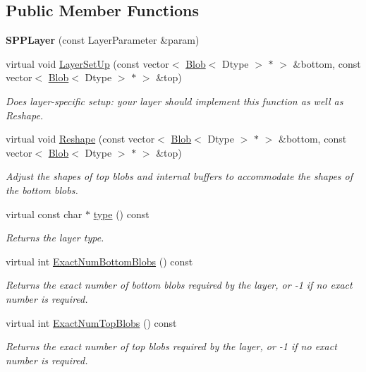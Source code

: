 \subsection*{Public Member Functions}
\begin{DoxyCompactItemize}
\item 
{\bfseries S\+P\+P\+Layer} (const Layer\+Parameter \&param)\hypertarget{classcaffe_1_1SPPLayer_a2f2bfccabcb9c04d28435ae6cb535dcf}{}\label{classcaffe_1_1SPPLayer_a2f2bfccabcb9c04d28435ae6cb535dcf}

\item 
virtual void \hyperlink{classcaffe_1_1SPPLayer_acf2c8649f50afd4a31b32cefb06de09a}{Layer\+Set\+Up} (const vector$<$ \hyperlink{classcaffe_1_1Blob}{Blob}$<$ Dtype $>$ $\ast$ $>$ \&bottom, const vector$<$ \hyperlink{classcaffe_1_1Blob}{Blob}$<$ Dtype $>$ $\ast$ $>$ \&top)
\begin{DoxyCompactList}\small\item\em Does layer-\/specific setup\+: your layer should implement this function as well as Reshape. \end{DoxyCompactList}\item 
virtual void \hyperlink{classcaffe_1_1SPPLayer_a9f54a92de230cde55b0dd4e996b9975e}{Reshape} (const vector$<$ \hyperlink{classcaffe_1_1Blob}{Blob}$<$ Dtype $>$ $\ast$ $>$ \&bottom, const vector$<$ \hyperlink{classcaffe_1_1Blob}{Blob}$<$ Dtype $>$ $\ast$ $>$ \&top)
\begin{DoxyCompactList}\small\item\em Adjust the shapes of top blobs and internal buffers to accommodate the shapes of the bottom blobs. \end{DoxyCompactList}\item 
virtual const char $\ast$ \hyperlink{classcaffe_1_1SPPLayer_a71054cf06805c96615332b70fdb45a8b}{type} () const \hypertarget{classcaffe_1_1SPPLayer_a71054cf06805c96615332b70fdb45a8b}{}\label{classcaffe_1_1SPPLayer_a71054cf06805c96615332b70fdb45a8b}

\begin{DoxyCompactList}\small\item\em Returns the layer type. \end{DoxyCompactList}\item 
virtual int \hyperlink{classcaffe_1_1SPPLayer_ab6912cfa8daa151407d024d5113e10b0}{Exact\+Num\+Bottom\+Blobs} () const 
\begin{DoxyCompactList}\small\item\em Returns the exact number of bottom blobs required by the layer, or -\/1 if no exact number is required. \end{DoxyCompactList}\item 
virtual int \hyperlink{classcaffe_1_1SPPLayer_a698395fdd26563b18ea0fac07d4e8026}{Exact\+Num\+Top\+Blobs} () const 
\begin{DoxyCompactList}\small\item\em Returns the exact number of top blobs required by the layer, or -\/1 if no exact number is required. \end{DoxyCompactList}\end{DoxyCompactItemize}

